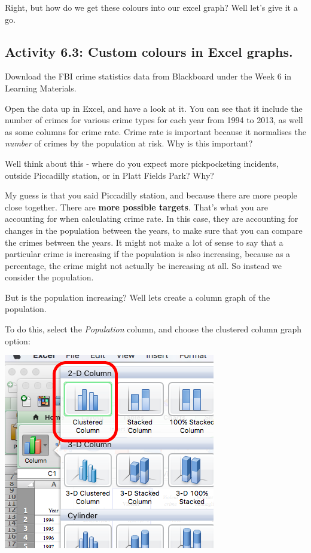 \documentclass[
]{book}
\begin{document}
Right, but how do we get these colours into our excel graph? Well let's give it a go.

\hypertarget{activity-6.3-custom-colours-in-excel-graphs.}{%
\subsection{Activity 6.3: Custom colours in Excel graphs.}\label{activity-6.3-custom-colours-in-excel-graphs.}}

Download the FBI crime statistics data from Blackboard under the Week 6 in Learning Materials.

Open the data up in Excel, and have a look at it. You can see that it include the number of crimes for various crime types for each year from 1994 to 2013, as well as some columns for crime rate. Crime rate is important because it normalises the \emph{number} of crimes by the population at risk. Why is this important?

Well think about this - where do you expect more pickpocketing incidents, outside Piccadilly station, or in Platt Fields Park? Why?

My guess is that you said Piccadilly station, and because there are more people close together. There are \textbf{more possible targets}. That's what you are accounting for when calculating crime rate. In this case, they are accounting for changes in the population between the years, to make sure that you can compare the crimes between the years. It might not make a lot of sense to say that a particular crime is increasing if the population is also increasing, because as a percentage, the crime might not actually be increasing at all. So instead we consider the population.

But is the population increasing? Well lets create a column graph of the population.

To do this, select the \emph{Population} column, and choose the clustered column graph option:

\includegraphics{imgs/desc_viz_1.png}
\end{document}
